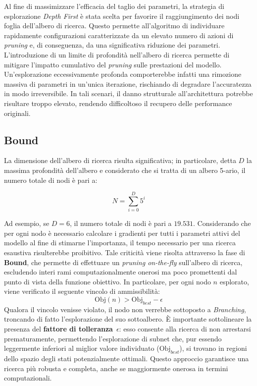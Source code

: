 Al fine di massimizzare l'efficacia del taglio dei parametri, la strategia di esplorazione \textit{Depth First} è stata scelta per favorire il raggiungimento dei nodi foglia dell'albero di ricerca. Questo permette all'algoritmo di individuare rapidamente configurazioni caratterizzate da un elevato numero di azioni di \textit{pruning} e, di conseguenza, da una significativa riduzione dei parametri.\newline
L'introduzione di un limite di profondità nell'albero di ricerca permette di mitigare l'impatto cumulativo del \textit{pruning} sulle prestazioni del modello. Un'esplorazione eccessivamente profonda comporterebbe infatti una rimozione massiva di parametri in un'unica iterazione, rischiando di degradare l'accuratezza in modo irreversibile. In tali scenari, il danno strutturale all'architettura potrebbe risultare troppo elevato, rendendo difficoltoso il recupero delle performance originali.

\subsection{Bound}
La dimensione dell'albero di ricerca risulta significativa; in particolare,
detta ${D}$ la massima profondità dell'albero e considerato che si tratta di un
albero 5-ario, il numero totale di nodi è pari a:

\begin{equation}
    {N} = \sum_{i=0}^{{D}} 5^i
\end{equation}

Ad esempio, se ${D} = 6$, il numero totale di nodi è pari a $19.531$.
Considerando che per ogni nodo è necessario calcolare i gradienti per tutti i
parametri attivi del modello al fine di stimarne l'importanza, il tempo
necessario per una ricerca esaustiva risulterebbe proibitivo. Tale criticità
viene risolta attraverso la fase di \textbf{Bound}, che permette di effettuare
un \textit{pruning on-the-fly} sull'albero di ricerca, escludendo interi rami
computazionalmente onerosi ma poco promettenti dal punto di vista della
funzione obiettivo. \newline In particolare, per ogni nodo $n$ esplorato, viene
verificato il seguente vincolo di ammissibilità:
\begin{equation}
    \text{Obj}(n) > \text{Obj}_{best} - \epsilon
\end{equation}
Qualora il vincolo venisse violato, il nodo non verrebbe sottoposto a \textit{Branching}, troncando di fatto l'esplorazione del suo sottoalbero. È importante sottolineare la presenza del \textbf{fattore di tolleranza}~$\epsilon$: esso consente alla ricerca di non arrestarsi prematuramente, permettendo l'esplorazione di subnet che, pur essendo leggermente inferiori al miglior valore individuato ($\text{Obj}_{best}$), si trovano in regioni dello spazio degli stati potenzialmente ottimali. Questo approccio garantisce una ricerca più robusta e completa, anche se maggiormente onerosa in termini computazionali.
